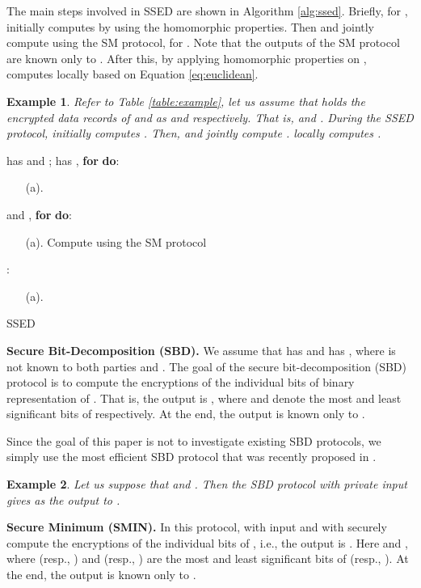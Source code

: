 \documentclass{article}
\newtheorem{example}{Example}
\begin{document}
The main steps involved in SSED are shown in  Algorithm \ref{alg:ssed}. Briefly, for ,  initially 
computes   by using the homomorphic properties. Then  and  jointly compute 
 using the SM protocol, for . Note that the outputs of the SM protocol are known 
only to . After this, by applying homomorphic properties on ,  
computes  locally based on Equation \ref{eq:euclidean}.
\begin{example} Refer to Table \ref{table:example}, let us assume that  
 holds the encrypted data records of  and  as  and  respectively. That is, 
   and   
 . During the SSED protocol,   
initially computes . 
Then,  and  jointly compute  .  locally computes . 
\hfill \\
\end{example}
\begin{algorithm}[!t]
\begin{algorithmic}[1]
\REQUIRE  has  and ;  has 
\STATE , \textbf{for}  \textbf{do}:
\begin{enumerate}\itemsep=0pt
    \item[(a).]     
\end{enumerate}
\STATE  and , \textbf{for}  \textbf{do}:
\begin{enumerate}\itemsep=0pt
    \item[(a).] Compute  using the SM protocol        
\end{enumerate}
\STATE :
\begin{enumerate}\itemsep=0pt
\item[(a).] 
\end{enumerate}
\end{algorithmic}
\caption{SSED }
\label{alg:ssed}
\end{algorithm}
\noindent \textbf{Secure Bit-Decomposition (SBD). } 
We assume that  has  and  has , where  is not 
known to both parties and . The goal 
of the secure bit-decomposition (SBD)  
protocol is to compute the encryptions of 
the individual bits of binary representation of \cite{schoenmaker-2006,bksam-asiaccs13}. That is, 
the output is , 
where   and  
denote the most and least significant bits of  respectively. At the end, the output  is known 
only to . 

Since the goal of this paper is not to investigate existing SBD protocols, we simply 
use the most efficient SBD protocol that was recently proposed in \cite{bksam-asiaccs13}.

\begin{example} Let us suppose that  and . Then the SBD protocol with private input  gives 
  as the output to .
\hfill \\
\end{example} 
\noindent \textbf{Secure Minimum (SMIN). }
In this protocol,  with 
input  and  with  securely compute 
the encryptions of the individual bits of , i.e., 
the output is . Here  
and , where  (resp., ) and 
 (resp., ) are the most and least significant bits of  (resp., ). At 
the end, the output  is known only to . 
\end{document}
